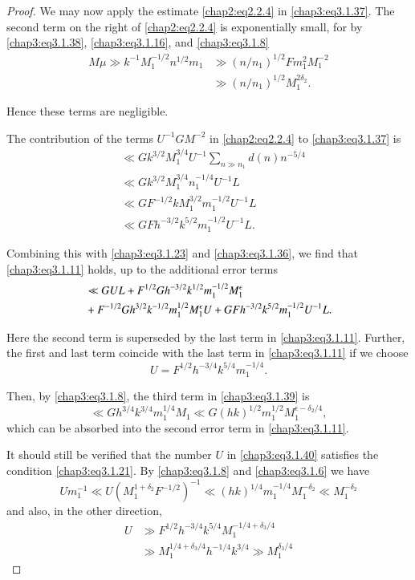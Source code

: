 \begin{proof}
We may now apply the estimate \eqref{chap2:eq2.2.4} in
\eqref{chap3:eq3.1.37}. The second term on the right of
\eqref{chap2:eq2.2.4} is exponentially small, for by
\eqref{chap3:eq3.1.38}, \eqref{chap3:eq3.1.16}, and
\eqref{chap3:eq3.1.8}
\begin{align*}
M\mu\gg k^{-1}M_1^{-1/2}n^{1/2}m_1&\gg\left(n/n_1\right)^{1/2} Fm_1^2
M_1^{-2}\\
&\gg \left(n/n_1\right)^{1/2}M_1^{2\delta_2}.
\end{align*}

Hence these terms are negligible.

The contribution of the terms $U^{-1}GM^{-2}$ in \eqref{chap2:eq2.2.4}
to \eqref{chap3:eq3.1.37} is 
\begin{align*}
& \ll Gk^{3/2}M_1^{3/4}U^{-1}\sum\limits_{n\gg n_1}d(n)n^{-5/4}\\
& \ll Gk^{3/2}M_1^{3/4}n_1^{-1/4}U^{-1}L\\
& \ll GF^{-1/2}kM_1^{3/2}m_1^{-1/2}U^{-1}L\\
& \ll GFh^{-3/2}k^{5/2}m_1^{-1/2}U^{-1}L.
\end{align*}\pageoriginale

Combining this with \eqref{chap3:eq3.1.23} and \eqref{chap3:eq3.1.36},
we find that \eqref{chap3:eq3.1.11} holds, up to the additional error
terms
\begin{align}
&\ll GUL+F^{1/2}Gh^{-3/2}k^{1/2}m_1^{-1/2}
M_1^\epsilon\label{chap3:eq3.1.39}\\ 
& +F^{-1/2}Gh^{3/2}k^{-1/2}m_1^{1/2}M_1^\epsilon U+GFh^{-3/2}k^{5/2}
m_1^{-1/2}U^{-1}L.\notag
\end{align}

Here the second term is superseded by the last term in
\eqref{chap3:eq3.1.11}. Further, the first and last term coincide with
the last term in \eqref{chap3:eq3.1.11} if we choose
\begin{equation}\label{chap3:eq3.1.40}
U=F^{1/2}h^{-3/4}k^{5/4}m_1^{-1/4}.
\end{equation}

Then, by \eqref{chap3:eq3.1.8}, the third term in
\eqref{chap3:eq3.1.39} is 
$$
\ll Gh^{3/4}k^{3/4}m_1^{1/4}M_1\ll G(hk)^{1/2}m_1^{1/2}M_1^{\epsilon
-\delta_2/4}, 
$$
which can be absorbed into the second error term in
\eqref{chap3:eq3.1.11}.

It should still be verified that the number $U$ in
\eqref{chap3:eq3.1.40} satisfies the condition
\eqref{chap3:eq3.1.21}. By \eqref{chap3:eq3.1.8} and
\eqref{chap3:eq3.1.6} we have 
$$
Um_1^{-1}\ll U\left(M_1^{1+\delta_2}F^{-1/2}\right)^{-1}\ll(hk)^{1/4}
m_1^{-1/4}M_1^{-\delta_2}\ll M_1^{-\delta_2}
$$
and also, in the other direction,
\begin{align*}
U &\gg F^{1/2}h^{-3/4}k^{5/4}M_1^{-1/4+\delta_3/4}\\
& \gg M_1^{1/4+\delta_3/4}h^{-1/4}k^{3/4}\gg M_1^{\delta_3/4}
\end{align*}


\end{proof}
